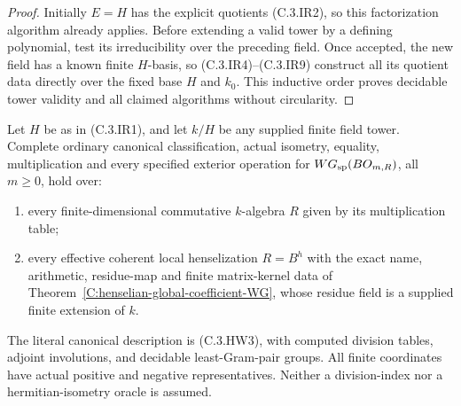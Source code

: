 \begin{proof}
Initially $E=H$ has the
explicit quotients (C.3.IR2),
so this factorization algorithm
already applies.
Before extending a valid
tower by a defining polynomial,
test its irreducibility over
the preceding field.
Once accepted, the new field
has a known finite $H$-basis,
so (C.3.IR4)--(C.3.IR9)
construct all its quotient
data directly over the fixed
base $H$ and $k_0$.
This inductive order proves
decidable tower validity and
all claimed algorithms without
circularity.
\end{proof}

\begin{theorem}
\label{C:infinite-residue-henselian-WG}
Let $H$ be as in (C.3.IR1), and let
$k/H$ be any supplied finite field tower.
Complete ordinary canonical classification,
actual isometry, equality, multiplication
and every specified exterior operation
for $WG_{\rm sp}(BO_{m,R})$, all $m\ge0$,
hold over:
\begin{enumerate}
\item every finite-dimensional commutative
$k$-algebra $R$ given by its multiplication
table;
\item every effective coherent local
henselization $R=B^h$ with the exact
name, arithmetic, residue-map and
finite matrix-kernel data of
Theorem~\ref{C:henselian-global-coefficient-WG},
whose residue field is a supplied
finite extension of $k$.
\end{enumerate}
The literal canonical description is
(C.3.HW3), with computed division
tables, adjoint involutions, and
decidable least-Gram-pair groups.
All finite coordinates have actual
positive and negative representatives.
Neither a division-index nor a
hermitian-isometry oracle is assumed.
\end{theorem}
